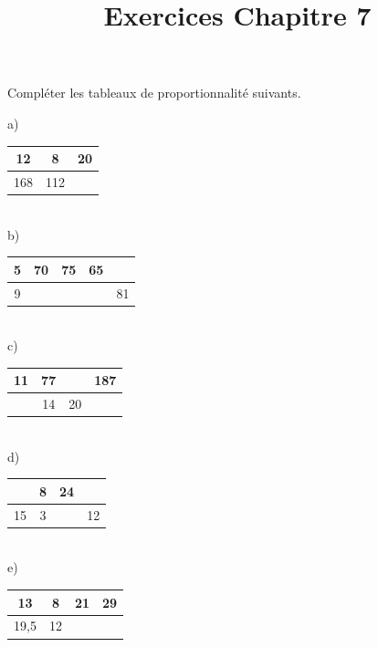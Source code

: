 \documentclass[12 pt]{extarticle}
\title{Exercices Chapitre 7}
\date{}
\theoremstyle{plain}
\begin{document}
Compléter les tableaux de proportionnalité suivants.

a) \begin{tabular}{ | c |c | c|  }\hline
  12 & 8 & 20 \\
 \hline
 168 & 112 & \\ \hline
\end{tabular} 

 \ \\ 
 
b) \begin{tabular}{|c | c | c | c |c| }
\hline
 5 & 70 & 75 & 65 & \\
\hline
9 & & & &81\\ \hline

\end{tabular}

 \ \\ 
 
 
c) \begin{tabular}{|c | c | c | c | }
\hline
11 & 77 & & 187     \\
\hline
 & 14 & 20 &  \\ \hline

\end{tabular}

 \ \\ 
 
d) \begin{tabular}{|c | c | c | c | }
\hline
& 8 & 24 &  \\
\hline
15 & 3 & & 12\\ \hline

\end{tabular}

 \ \\ 

e) \begin{tabular}{|c | c | c | c | }
\hline
13 & 8 & 21 & 29 \\
\hline
19,5 & 12 & & \\ \hline

\end{tabular}



 	
\end{document}
